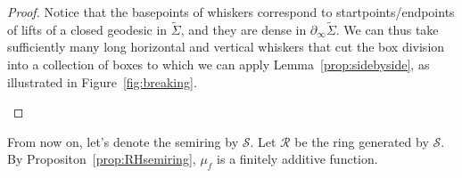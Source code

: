 \begin{proof}
Notice that the basepoints of whiskers correspond to
startpoints/endpoints of lifts of a closed geodesic in
$\tilde{\Sigma}$, and they are dense
in $\partial_{\infty}\tilde{\Sigma}$. We can thus take sufficiently many long horizontal and vertical whiskers that cut the box division into a collection of boxes to which we can apply Lemma~\ref{prop:sidebyside}, as illustrated in Figure~\ref{fig:breaking}. \qedhere
\begin{figure}
\end{figure}
\end{proof}

From now on, let's denote the semiring by $\mathcal{S}$.
Let $\mathcal{R}$ be the ring generated by $\mathcal{S}$.
By Propositon~\ref{prop:RHsemiring}, $\mu_{f}$ is a finitely additive function.
 
